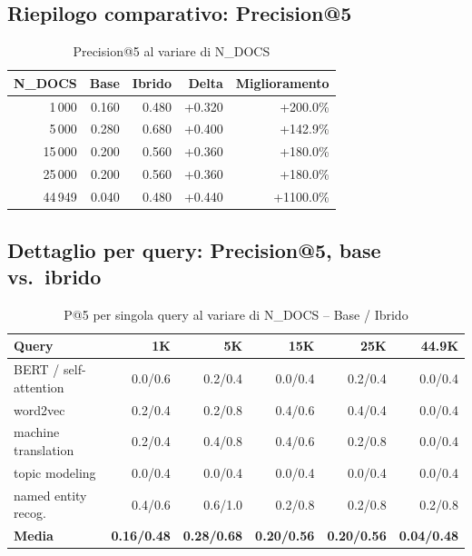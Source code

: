 \documentclass[12pt,a4paper]{article}
\begin{document}
\subsection{Riepilogo comparativo: Precision@5}

\begin{table}[H]
  \centering
  \caption{Precision@5 al variare di N\_DOCS}
  \begin{tabular}{rrrrr}
    \toprule
    \textbf{N\_DOCS} & \textbf{Base} & \textbf{Ibrido} & \textbf{Delta} & \textbf{Miglioramento} \\
    \midrule
    1\,000  & 0.160 & 0.480 & +0.320 & +200.0\% \\
    5\,000  & 0.280 & 0.680 & +0.400 & +142.9\% \\
    15\,000 & 0.200 & 0.560 & +0.360 & +180.0\% \\
    25\,000 & 0.200 & 0.560 & +0.360 & +180.0\% \\
    44\,949 & 0.040 & 0.480 & +0.440 & +1100.0\% \\
    \bottomrule
  \end{tabular}
\end{table}

\subsection{Dettaglio per query: Precision@5, base vs.\ ibrido}

\begin{table}[H]
  \centering
  \caption{P@5 per singola query al variare di N\_DOCS -- Base / Ibrido}
  \label{tab:p5-detail}
  \small
  \begin{tabular}{p{6cm}rrrrr}
    \toprule
    \textbf{Query} & \textbf{1K} & \textbf{5K} & \textbf{15K} & \textbf{25K} & \textbf{44.9K} \\
    \midrule
    BERT / self-attention  & 0.0/0.6 & 0.2/0.4 & 0.0/0.4 & 0.2/0.4 & 0.0/0.4 \\
    word2vec               & 0.2/0.4 & 0.2/0.8 & 0.4/0.6 & 0.4/0.4 & 0.0/0.4 \\
    machine translation    & 0.2/0.4 & 0.4/0.8 & 0.4/0.6 & 0.2/0.8 & 0.0/0.4 \\
    topic modeling         & 0.0/0.4 & 0.0/0.4 & 0.0/0.4 & 0.0/0.4 & 0.0/0.4 \\
    named entity recog.    & 0.4/0.6 & 0.6/1.0 & 0.2/0.8 & 0.2/0.8 & 0.2/0.8 \\
    \midrule
    \textbf{Media}         & \textbf{0.16/0.48} & \textbf{0.28/0.68} & \textbf{0.20/0.56} & \textbf{0.20/0.56} & \textbf{0.04/0.48} \\
    \bottomrule
  \end{tabular}
\end{table}
\end{document}

